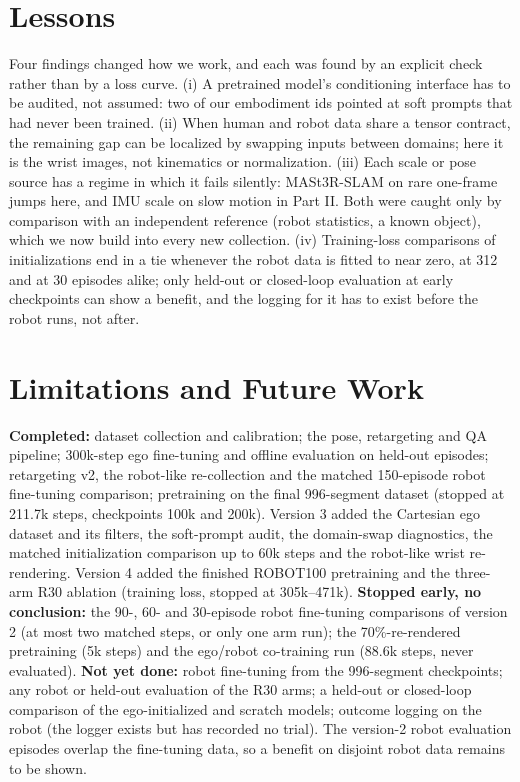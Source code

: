 \documentclass[conference,10pt]{IEEEtran}
\begin{document}
\section{Lessons}\label{p1:sec:lessons}
Four findings changed how we work, and each was found by an explicit check rather than by a loss curve. (i) A pretrained
model's conditioning interface has to be audited, not assumed: two of our embodiment ids pointed at soft prompts that had never
been trained. (ii) When human and robot data share a tensor contract, the remaining gap can be localized by swapping inputs
between domains; here it is the wrist images, not kinematics or normalization. (iii) Each scale or pose source has a regime in
which it fails silently: MASt3R-SLAM on rare one-frame jumps here, and IMU scale on slow motion in Part II. Both were caught only
by comparison with an independent reference (robot statistics, a known object), which we now build into every new collection.
(iv) Training-loss comparisons of initializations end in a tie whenever the robot data is fitted to near zero, at 312 and at
30 episodes alike; only held-out or closed-loop evaluation at early checkpoints can show a benefit, and the logging for it has
to exist before the robot runs, not after.

\section{Limitations and Future Work}\label{p1:sec:lim}
\textbf{Completed:} dataset collection and calibration; the pose, retargeting and QA pipeline; 300k-step ego fine-tuning and
offline evaluation on held-out episodes; retargeting v2, the robot-like re-collection and the matched 150-episode robot
fine-tuning comparison; pretraining on the final 996-segment dataset (stopped at 211.7k steps, checkpoints 100k and 200k).
Version 3 added the Cartesian ego dataset and its filters, the soft-prompt audit, the domain-swap diagnostics, the matched
initialization comparison up to 60k steps and the robot-like wrist re-rendering. Version 4 added the finished ROBOT100
pretraining and the three-arm R30 ablation (training loss, stopped at 305k--471k). \textbf{Stopped early, no conclusion:} the
90-, 60- and 30-episode robot fine-tuning comparisons of version 2 (at most two matched steps, or only one arm run); the
70\%-re-rendered pretraining (5k steps) and the ego/robot co-training run (88.6k steps, never evaluated).
\textbf{Not yet done:} robot fine-tuning from the 996-segment checkpoints; any robot or held-out evaluation of the R30 arms;
a held-out or closed-loop comparison of the ego-initialized and scratch models; outcome logging on the robot (the logger
exists but has recorded no trial). The version-2 robot evaluation episodes overlap the
fine-tuning data, so a benefit on disjoint robot data remains to be shown.
\end{document}
